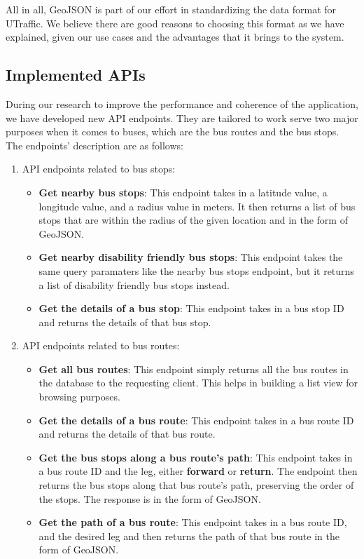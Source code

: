 All in all, GeoJSON is part of our effort in standardizing the data format for UTraffic. We believe there are good reasons to choosing this format as we have explained, given our use cases and the advantages that it brings to the system.

\subsection{Implemented APIs}

During our research to improve the performance and coherence of the application, we have developed new API endpoints. They are tailored to work serve two major purposes when it comes to buses, which are the bus routes and the bus stops. The endpoints' description are as follows:
\begin{enumerate}
    \item API endpoints related to bus stops:
    \begin{itemize}
        \item \textbf{Get nearby bus stops}: This endpoint takes in a latitude value, a longitude value, and a radius value in meters. It then returns a list of bus stops that are within the radius of the given location and in the form of GeoJSON.
        \item \textbf{Get nearby disability friendly bus stops}: This endpoint takes the same query paramaters like the nearby bus stops endpoint, but it returns a list of disability friendly bus stops instead.
        \item \textbf{Get the details of a bus stop}: This endpoint takes in a bus stop ID and returns the details of that bus stop.
    \end{itemize}
    \item API endpoints related to bus routes:
    \begin{itemize}
        \item \textbf{Get all bus routes}: This endpoint simply returns all the bus routes in the database to the requesting client. This helps in building a list view for browsing purposes.
        \item \textbf{Get the details of a bus route}: This endpoint takes in a bus route ID and returns the details of that bus route.
        \item \textbf{Get the bus stops along a bus route's path}: This endpoint takes in a bus route ID and the leg, either \textbf{forward} or \textbf{return}. The endpoint then returns the bus stops along that bus route's path, preserving the order of the stops. The response is in the form of GeoJSON.
        \item \textbf{Get the path of a bus route}: This endpoint takes in a bus route ID, and the desired leg and then returns the path of that bus route in the form of GeoJSON.
    \end{itemize}
\end{enumerate}

